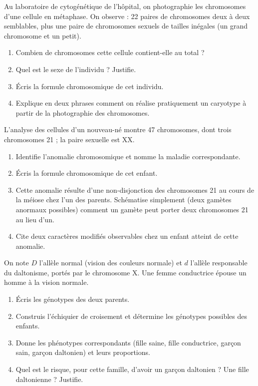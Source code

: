 \documentclass[11pt]{article}
\newcounter{popsec}
\newcounter{popsub}
\newcommand{\courssub}[1]{%
  \stepcounter{popsub}%
  \par\vspace{9pt}\noindent{\popxbold\fontsize{11.5}{13}\selectfont\color{popink}{\color{poporange}\thepopsec.\thepopsub}\hspace{6pt}#1}\par\nopagebreak\vspace{4pt}
}
\begin{document}
\courssub{Je m'entraîne}

\begin{exercice}
Au laboratoire de cytogénétique de l'hôpital, on photographie les chromosomes d'une cellule en métaphase. On observe : 22 paires de chromosomes deux à deux semblables, plus une paire de chromosomes sexuels de tailles inégales (un grand chromosome et un petit).
\begin{enumerate}
\item Combien de chromosomes cette cellule contient-elle au total ?
\item Quel est le sexe de l'individu ? Justifie.
\item Écris la formule chromosomique de cet individu.
\item Explique en deux phrases comment on réalise pratiquement un caryotype à partir de la photographie des chromosomes.
\end{enumerate}
\end{exercice}

\begin{exercice}
L'analyse des cellules d'un nouveau-né montre 47 chromosomes, dont trois chromosomes 21 ; la paire sexuelle est XX.
\begin{enumerate}
\item Identifie l'anomalie chromosomique et nomme la maladie correspondante.
\item Écris la formule chromosomique de cet enfant.
\item Cette anomalie résulte d'une non-disjonction des chromosomes 21 au cours de la méiose chez l'un des parents. Schématise simplement (deux gamètes anormaux possibles) comment un gamète peut porter deux chromosomes 21 au lieu d'un.
\item Cite deux caractères modifiés observables chez un enfant atteint de cette anomalie.
\end{enumerate}
\end{exercice}

\begin{exercice}
On note $D$ l'allèle normal (vision des couleurs normale) et $d$ l'allèle responsable du daltonisme, portés par le chromosome X. Une femme conductrice épouse un homme à la vision normale.
\begin{enumerate}
\item Écris les génotypes des deux parents.
\item Construis l'échiquier de croisement et détermine les génotypes possibles des enfants.
\item Donne les phénotypes correspondants (fille saine, fille conductrice, garçon sain, garçon daltonien) et leurs proportions.
\item Quel est le risque, pour cette famille, d'avoir un garçon daltonien ? Une fille daltonienne ? Justifie.
\end{enumerate}
\end{exercice}
\end{document}
